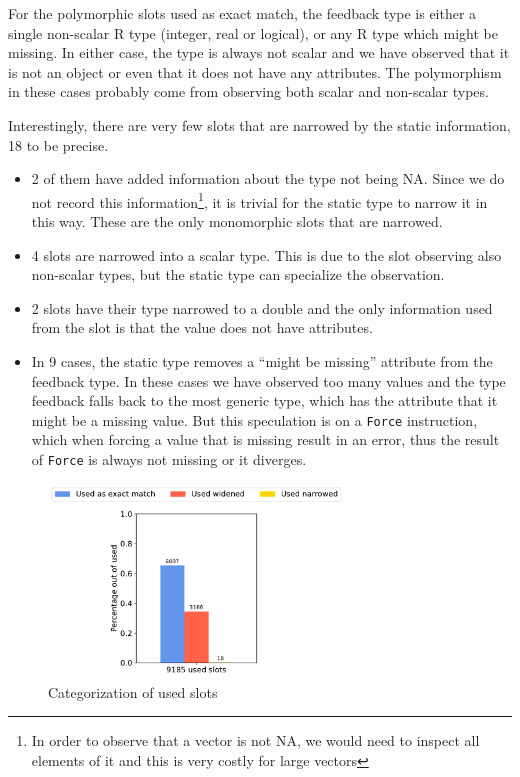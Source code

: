 For the polymorphic slots used as exact match, the feedback type is either a single non-scalar R type (integer, real or logical), or any R type which might be missing. In either case, the type is always not scalar and we have observed that it is not an object or even that it does not have any attributes. The polymorphism in these cases probably come from observing both scalar and non-scalar types.

Interestingly, there are very few slots that are narrowed by the static information, 18 to be precise.

\begin{itemize}
	\item{} 2 of them have added information about the type not being NA. Since we do not record this information\footnote{In order to observe that a vector is not NA, we would need to inspect all elements of it and this is very costly for large vectors}, it is trivial for the static type to narrow it in this way. These are the only monomorphic slots that are narrowed.
	\item{} 4 slots are narrowed into a scalar type. This is due to the slot observing also non-scalar types, but the static type can specialize the observation.
	\item{} 2 slots have their type narrowed to a double and the only information used from the slot is that the value does not have attributes.
	\item{} In 9 cases, the static type removes a \enquote{might be missing} attribute from the feedback type. In these cases we have observed too many values and the type feedback falls back to the most generic type, which has the attribute that it might be a missing value. But this speculation is on a \texttt{Force} instruction, which when forcing a value that is missing result in an error, thus the result of \texttt{Force} is always not missing or it diverges.
\end{itemize}


\begin{figure}[t]
	\centering
	\includegraphics[width=0.7\textwidth]{figures/used.pdf}
	\caption{Categorization of used slots}\label{fig:graph-used}
\end{figure}

